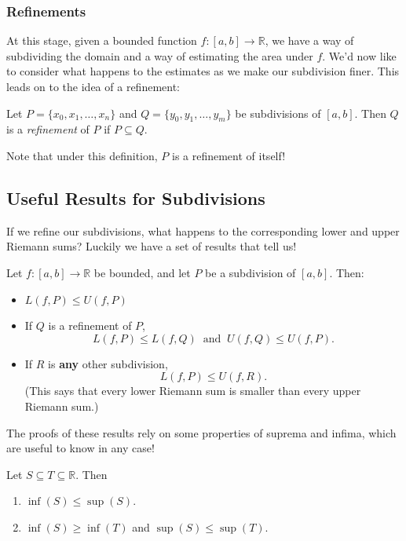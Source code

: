 \documentclass[
  10pt,
  a4paper]{article}
\providecommand{\tightlist}{%
  \setlength{\itemsep}{0pt}\setlength{\parskip}{0pt}}
\theoremstyle{plain}
\theoremstyle{definition}
\theoremstyle{plain}
\theoremstyle{plain}
\theoremstyle{plain}
\theoremstyle{plain}
\theoremstyle{definition}
\theoremstyle{definition}
\theoremstyle{remark}
\theoremstyle{remark}
\let\BeginKnitrBlock\begin \let\EndKnitrBlock\end
\begin{document}
\hypertarget{refinements}{%
\subsubsection{Refinements}\label{refinements}}

At this stage, given a bounded function \(f:[a,b] \to \mathbb{R}\), we have a way of subdividing the domain and a way of estimating the area under \(f\). We'd now like to consider what happens to the estimates as we make our subdivision finer. This leads on to the idea of a refinement:

\BeginKnitrBlock{definition}[Refinement]
{\label{def:def4} }Let \(P = \lbrace x_0, x_1, \ldots, x_n \rbrace\) and \(Q = \lbrace y_0, y_1, \ldots, y_m \rbrace\) be subdivisions of \([a,b].\) Then \(Q\) is a \emph{refinement} of \(P\) if \(P\subseteq Q\).
\EndKnitrBlock{definition}
Note that under this definition, \(P\) is a refinement of itself!

\hypertarget{useful-results-for-subdivisions}{%
\subsection{Useful Results for Subdivisions}\label{useful-results-for-subdivisions}}

If we refine our subdivisions, what happens to the corresponding lower and upper Riemann sums? Luckily we have a set of results that tell us!

\BeginKnitrBlock{proposition}
{\label{prp:prop1} }Let \(f:[a,b] \to \mathbb{R}\) be bounded, and let \(P\) be a subdivision of \([a,b].\) Then:

\begin{itemize}
\tightlist
\item
  \(L(f,P) \leq U(f,P)\)
\item
  If \(Q\) is a refinement of \(P\), \[L(f,P) \leq L(f,Q)\;\; \text{and} \;\; U(f,Q) \leq U(f,P).\]
\item
  If \(R\) is \textbf{any} other subdivision, \[L(f,P) \leq U(f,R).\] (This says that every lower Riemann sum is smaller than every upper Riemann sum.)
\end{itemize}
\EndKnitrBlock{proposition}

The proofs of these results rely on some properties of suprema and infima, which are useful to know in any case!

\BeginKnitrBlock{proposition}
{\label{prp:prop2} }
Let \(S \subseteq T \subseteq \mathbb{R}\). Then

\begin{enumerate}
\def\labelenumi{\arabic{enumi}.}
\tightlist
\item
  \(\inf(S) \leq \sup(S).\)
\item
  \(\inf(S) \geq \inf(T)\) and \(\sup(S) \leq \sup(T).\)
\end{enumerate}
\EndKnitrBlock{proposition}
\end{document}
